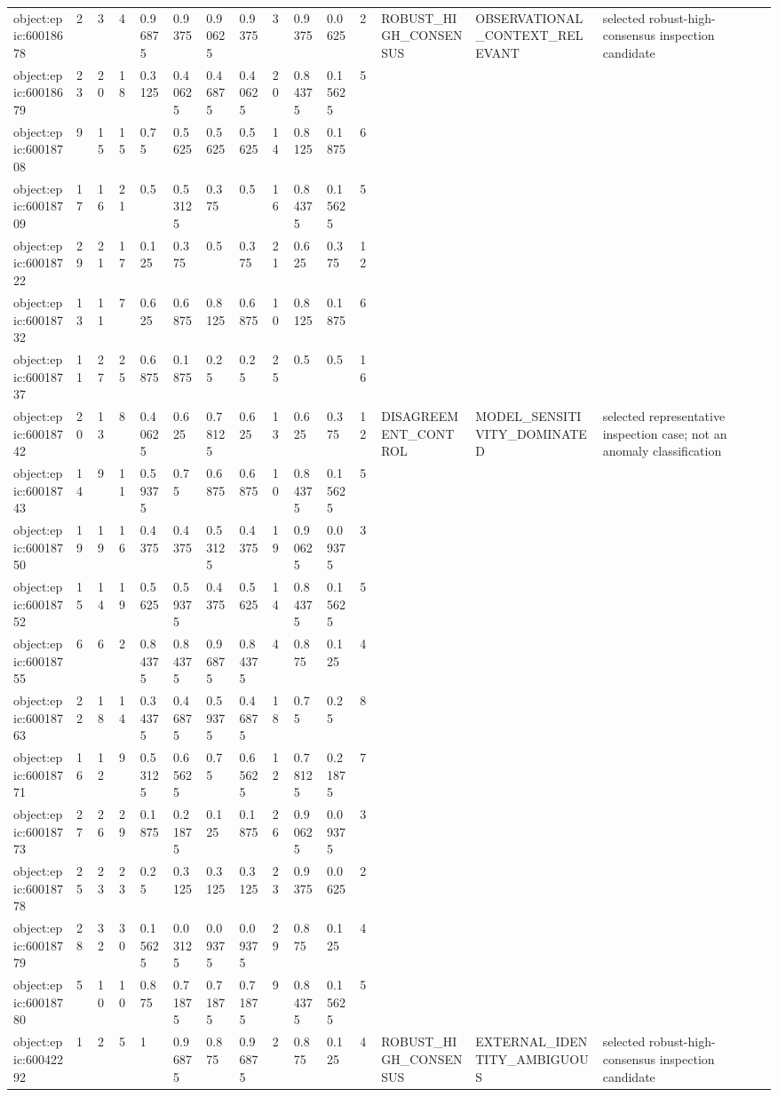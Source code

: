 \begin{longtable}{lllllllllllllll}
object:epic:60018678 & 2 & 3 & 4 & 0.96875 & 0.9375 & 0.90625 & 0.9375 & 3 & 0.9375 & 0.0625 & 2 & ROBUST\_HIGH\_CONSENSUS & OBSERVATIONAL\_CONTEXT\_RELEVANT & selected robust-high-consensus inspection candidate \\
object:epic:60018679 & 23 & 20 & 18 & 0.3125 & 0.40625 & 0.46875 & 0.40625 & 20 & 0.84375 & 0.15625 & 5 &  &  &  \\
object:epic:60018708 & 9 & 15 & 15 & 0.75 & 0.5625 & 0.5625 & 0.5625 & 14 & 0.8125 & 0.1875 & 6 &  &  &  \\
object:epic:60018709 & 17 & 16 & 21 & 0.5 & 0.53125 & 0.375 & 0.5 & 16 & 0.84375 & 0.15625 & 5 &  &  &  \\
object:epic:60018722 & 29 & 21 & 17 & 0.125 & 0.375 & 0.5 & 0.375 & 21 & 0.625 & 0.375 & 12 &  &  &  \\
object:epic:60018732 & 13 & 11 & 7 & 0.625 & 0.6875 & 0.8125 & 0.6875 & 10 & 0.8125 & 0.1875 & 6 &  &  &  \\
object:epic:60018737 & 11 & 27 & 25 & 0.6875 & 0.1875 & 0.25 & 0.25 & 25 & 0.5 & 0.5 & 16 &  &  &  \\
object:epic:60018742 & 20 & 13 & 8 & 0.40625 & 0.625 & 0.78125 & 0.625 & 13 & 0.625 & 0.375 & 12 & DISAGREEMENT\_CONTROL & MODEL\_SENSITIVITY\_DOMINATED & selected representative inspection case; not an anomaly classification \\
object:epic:60018743 & 14 & 9 & 11 & 0.59375 & 0.75 & 0.6875 & 0.6875 & 10 & 0.84375 & 0.15625 & 5 &  &  &  \\
object:epic:60018750 & 19 & 19 & 16 & 0.4375 & 0.4375 & 0.53125 & 0.4375 & 19 & 0.90625 & 0.09375 & 3 &  &  &  \\
object:epic:60018752 & 15 & 14 & 19 & 0.5625 & 0.59375 & 0.4375 & 0.5625 & 14 & 0.84375 & 0.15625 & 5 &  &  &  \\
object:epic:60018755 & 6 & 6 & 2 & 0.84375 & 0.84375 & 0.96875 & 0.84375 & 4 & 0.875 & 0.125 & 4 &  &  &  \\
object:epic:60018763 & 22 & 18 & 14 & 0.34375 & 0.46875 & 0.59375 & 0.46875 & 18 & 0.75 & 0.25 & 8 &  &  &  \\
object:epic:60018771 & 16 & 12 & 9 & 0.53125 & 0.65625 & 0.75 & 0.65625 & 12 & 0.78125 & 0.21875 & 7 &  &  &  \\
object:epic:60018773 & 27 & 26 & 29 & 0.1875 & 0.21875 & 0.125 & 0.1875 & 26 & 0.90625 & 0.09375 & 3 &  &  &  \\
object:epic:60018778 & 25 & 23 & 23 & 0.25 & 0.3125 & 0.3125 & 0.3125 & 23 & 0.9375 & 0.0625 & 2 &  &  &  \\
object:epic:60018779 & 28 & 32 & 30 & 0.15625 & 0.03125 & 0.09375 & 0.09375 & 29 & 0.875 & 0.125 & 4 &  &  &  \\
object:epic:60018780 & 5 & 10 & 10 & 0.875 & 0.71875 & 0.71875 & 0.71875 & 9 & 0.84375 & 0.15625 & 5 &  &  &  \\
object:epic:60042292 & 1 & 2 & 5 & 1 & 0.96875 & 0.875 & 0.96875 & 2 & 0.875 & 0.125 & 4 & ROBUST\_HIGH\_CONSENSUS & EXTERNAL\_IDENTITY\_AMBIGUOUS & selected robust-high-consensus inspection candidate \\
\hline
\end{longtable}
